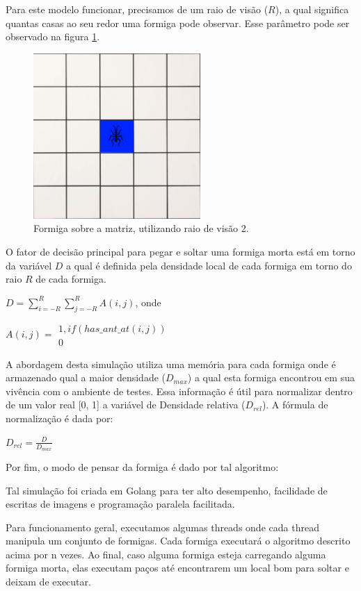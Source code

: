 \documentclass[conference]{IEEEtran}
\begin{document}
Para este modelo funcionar, precisamos de um raio de visão ($R$), a qual significa quantas casas ao seu redor uma formiga pode observar. Esse parâmetro pode ser observado na figura \ref{fig:raio}.

\begin{figure}[h]
\centering
\includegraphics[width=2.5in]{formiga.png}
\caption{Formiga sobre a matriz, utilizando raio de visão 2.}
\label{fig:raio}
\end{figure}

O fator de decisão principal para pegar e soltar uma formiga morta está em torno da variável $D$ a qual é definida pela densidade local de cada formiga em torno do raio $R$ de cada formiga.


$D = \sum_{i=-R}^{R}\sum_{j=-R}^{R}A(i,j)$, onde

$A(i,j) =
\begin{array}{ll}
    1, if(has\_ant\_at(i,j))\\
    0
\end{array}
$

A abordagem desta simulação utiliza uma memória para cada formiga onde é armazenado qual a maior densidade ($D_{max}$) a qual esta formiga encontrou em sua vivência com o ambiente de testes. Essa informação é útil para normalizar dentro de um valor real [0, 1] a variável de Densidade relativa ($D_{rel}$). A fórmula de normalização é dada por:

$
    D_{rel} = \frac{D}{D_{max}}
$

Por fim, o modo de pensar da formiga é dado por tal algoritmo:



Tal simulação foi criada em Golang para ter alto desempenho, facilidade de escritas de imagens e programação paralela facilitada.

Para funcionamento geral, executamos algumas threads onde cada thread manipula um conjunto de formigas. Cada formiga executará o algoritmo descrito acima por n vezes. Ao final, caso alguma formiga esteja carregando alguma formiga morta, elas executam paços até encontrarem um local bom para soltar e deixam de executar.
\end{document}
